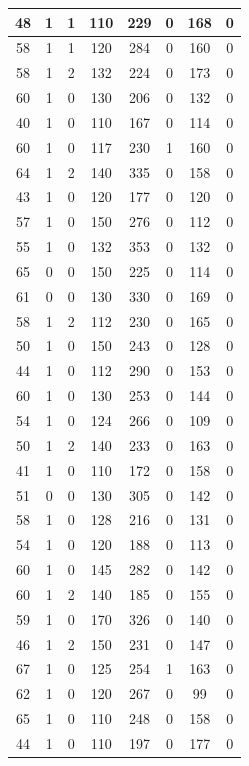 \documentclass{article}
\begin{document}
\begin{longtable}{|c|c|c|c|c|c|c|c|}
\hline
48 & 1 & 1 & 110 & 229 & 0 & 168 & 0 \\
\hline
58 & 1 & 1 & 120 & 284 & 0 & 160 & 0 \\
\hline
58 & 1 & 2 & 132 & 224 & 0 & 173 & 0 \\
\hline
60 & 1 & 0 & 130 & 206 & 0 & 132 & 0 \\
\hline
40 & 1 & 0 & 110 & 167 & 0 & 114 & 0 \\
\hline
60 & 1 & 0 & 117 & 230 & 1 & 160 & 0 \\
\hline
64 & 1 & 2 & 140 & 335 & 0 & 158 & 0 \\
\hline
43 & 1 & 0 & 120 & 177 & 0 & 120 & 0 \\
\hline
57 & 1 & 0 & 150 & 276 & 0 & 112 & 0 \\
\hline
55 & 1 & 0 & 132 & 353 & 0 & 132 & 0 \\
\hline
65 & 0 & 0 & 150 & 225 & 0 & 114 & 0 \\
\hline
61 & 0 & 0 & 130 & 330 & 0 & 169 & 0 \\
\hline
58 & 1 & 2 & 112 & 230 & 0 & 165 & 0 \\
\hline
50 & 1 & 0 & 150 & 243 & 0 & 128 & 0 \\
\hline
44 & 1 & 0 & 112 & 290 & 0 & 153 & 0 \\
\hline
60 & 1 & 0 & 130 & 253 & 0 & 144 & 0 \\
\hline
54 & 1 & 0 & 124 & 266 & 0 & 109 & 0 \\
\hline
50 & 1 & 2 & 140 & 233 & 0 & 163 & 0 \\
\hline
41 & 1 & 0 & 110 & 172 & 0 & 158 & 0 \\
\hline
51 & 0 & 0 & 130 & 305 & 0 & 142 & 0 \\
\hline
58 & 1 & 0 & 128 & 216 & 0 & 131 & 0 \\
\hline
54 & 1 & 0 & 120 & 188 & 0 & 113 & 0 \\
\hline
60 & 1 & 0 & 145 & 282 & 0 & 142 & 0 \\
\hline
60 & 1 & 2 & 140 & 185 & 0 & 155 & 0 \\
\hline
59 & 1 & 0 & 170 & 326 & 0 & 140 & 0 \\
\hline
46 & 1 & 2 & 150 & 231 & 0 & 147 & 0 \\
\hline
67 & 1 & 0 & 125 & 254 & 1 & 163 & 0 \\
\hline
62 & 1 & 0 & 120 & 267 & 0 & 99 & 0 \\
\hline
65 & 1 & 0 & 110 & 248 & 0 & 158 & 0 \\
\hline
44 & 1 & 0 & 110 & 197 & 0 & 177 & 0 \\

\end{longtable}
\end{document}
